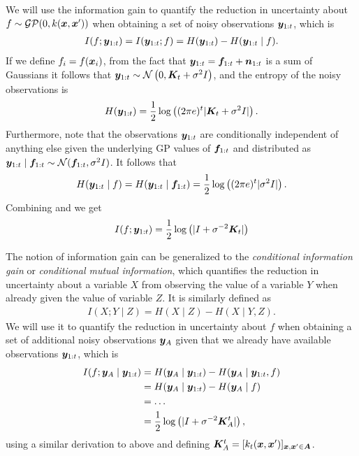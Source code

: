 We will use the information gain to quantify the reduction in uncertainty
about $f \sim \mathcal{GP}(0, k(\bm{x}, \bm{x}'))$ when obtaining a set of
noisy observations $\bm{y}_{1:t}$, which is
\begin{align*}
I(f; \bm{y}_{1:t}) = I(\bm{y}_{1:t}; f) = H(\bm{y}_{1:t}) - H(\bm{y}_{1:t}\mid f).
\end{align*}
If we define $f_i = f(\bm{x}_i)$, from the fact that
$\bm{y}_{1:t} = \bm{f}_{1:t} + \bm{n}_{1:t}$ is a sum of Gaussians it follows that
$\bm{y}_{1:t} \sim \mathcal{N}\left(0, \bm{K}_t + \sigma^2 I\right)$, and the
entropy of the noisy observations is
\begin{align}\label{eq:hy}
H(\bm{y}_{1:t}) = \frac{1}{2}\log\left((2\pi e)^t |\bm{K}_t + \sigma^2 I|\right).
\end{align}
Furthermore, note that the observations $\bm{y}_{1:t}$ are conditionally
independent of anything else given the underlying GP values
of $\bm{f}_{1:t}$ and distributed as
$\bm{y}_{1:t}\mid \bm{f}_{1:t} \sim \mathcal{N}(\bm{f}_{1:t}, \sigma^2 I)$.
It follows that
\begin{align}\label{eq:hyf}
H(\bm{y}_{1:t}\mid f) = H(\bm{y}_{1:t}\mid \bm{f}_{1:t}) = \frac{1}{2}\log\left((2\pi e)^t |\sigma^2 I|\right).
\end{align}
Combining  and  we get
\begin{align*}
I(f; \bm{y}_{1:t}) = \frac{1}{2}\log\left(|I + \sigma^{-2} \bm{K}_t|\right)
\end{align*} 

The notion of information gain can be generalized to the \emph{conditional
information gain} or \emph{conditional mutual information}, which quantifies
the reduction in uncertainty about a variable $X$ from observing the value
of a variable $Y$ when already given the value of variable $Z$. It is
similarly defined as
\begin{align*}
I(X; Y\mid Z) = H(X\mid Z) - H(X\mid Y, Z).
\end{align*} We will use it to quantify the reduction in uncertainty about $f$ when
obtaining a set of additional noisy observations $\bm{y}_A$ given that
we already have available observations $\bm{y}_{1:t}$, which is
\begin{align*}
I(f; \bm{y}_A\mid \bm{y}_{1:t}) &= H(\bm{y}_A\mid \bm{y}_{1:t}) - H(\bm{y}_A\mid \bm{y}_{1:t}, f)\\
                          &= H(\bm{y}_A\mid \bm{y}_{1:t}) - H(\bm{y}_A\mid f)\\
                          &= \ldots\\
                          &= \frac{1}{2}\log\left(|I + \sigma^{-2} \bm{K}^t_A|\right),
\end{align*}
using a similar derivation to above and defining
${\bm{K}^t_A = [k_t(\bm{x}, \bm{x}')]_{\bm{x}, \bm{x}'\in\bm{A}}}$.
